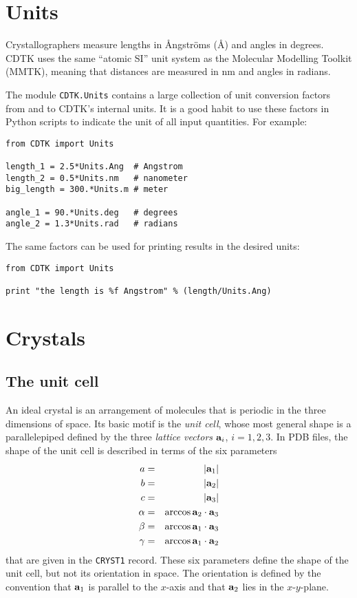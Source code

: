 \documentclass[11pt]{article}
\newcommand{\vect}[1]{{\bf #1}}
\newcommand{\va}{\vect{a}}
\begin{document}
\newpage
\begin{sloppy}

\section{Units}

Crystallographers measure lengths in {\AA}ngstr{\"om}s (\AA) and angles
in degrees. CDTK uses the same ``atomic SI'' unit system as the
Molecular Modelling Toolkit (MMTK), meaning that distances are
measured in nm and angles in radians.

The module \texttt{CDTK.Units} contains a large collection of unit
conversion factors from and to CDTK's internal units. It is a good
habit to use these factors in Python scripts to indicate the unit
of all input quantities. For example:

\begin{verbatim}
from CDTK import Units

length_1 = 2.5*Units.Ang  # Angstrom
length_2 = 0.5*Units.nm   # nanometer
big_length = 300.*Units.m # meter

angle_1 = 90.*Units.deg   # degrees
angle_2 = 1.3*Units.rad   # radians
\end{verbatim}

The same factors can be used for printing results in the desired units:

\begin{verbatim}
from CDTK import Units

print "the length is %f Angstrom" % (length/Units.Ang)
\end{verbatim}


\section{Crystals}

\subsection{The unit cell}

An ideal crystal is an arrangement of molecules that is periodic in
the three dimensions of space. Its basic motif is the \textit{unit cell},
whose most general shape is a parallelepiped defined by the three
\textit{lattice vectors} $\va_i$, $i=1, 2, 3$.
In PDB files, the shape of the unit cell is described
in terms of the six parameters
\begin{eqnarray}
a &=& |\va_1| \nonumber \\
b &=& |\va_2| \nonumber \\
c &=& |\va_3| \nonumber \\
\alpha &=& \arccos \va_2\cdot\va_3 \nonumber \\
\beta  &=& \arccos \va_1\cdot\va_3 \nonumber \\
\gamma &=& \arccos \va_1\cdot\va_2 \nonumber
\end{eqnarray}
that are given in the \texttt{CRYST1} record.
These six parameters define the shape of the unit cell, but not its
orientation in space. The orientation is defined by the convention
that $\va_1$ is parallel to the $x$-axis and that $\va_2$
lies in the $x$-$y$-plane.


\end{sloppy}
\end{document}
